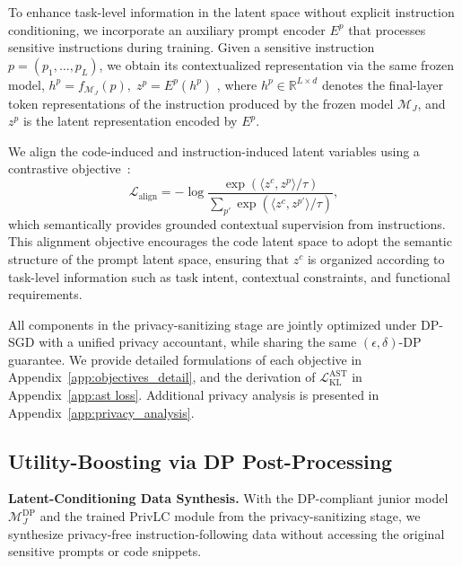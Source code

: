 \documentclass{article}
\theoremstyle{plain}
\theoremstyle{definition}
\theoremstyle{remark}
\begin{document}
To enhance task-level information in the latent space without explicit instruction conditioning, we incorporate an auxiliary prompt encoder $E^p$ that processes sensitive instructions during training. 
Given a sensitive instruction $p = (p_1, \dots, p_L)$, we obtain its contextualized representation via the same frozen model,
$h^p = f_{\mathcal{M}_J}(p),
\;
z^p = E^p(h^p)$
, where $h^p \in \mathbb{R}^{L \times d}$ denotes the final-layer token representations of the instruction produced by the frozen model $\mathcal{M}_J$, and $z^p$ is the latent representation encoded by $E^p$.


We align the code-induced and instruction-induced latent variables using a contrastive objective~\cite{oord2018representation}:
\begin{equation}
\mathcal{L}_{\text{align}} = - \log 
\frac{\exp(\langle z^c, z^p \rangle / \tau)}
{\sum_{p'} \exp(\langle z^c, z^{p'} \rangle / \tau)},
\end{equation}
which semantically provides grounded contextual supervision from instructions. This alignment objective encourages the code latent space to adopt the semantic structure of the prompt latent space, ensuring that $z^c$ is organized according to task-level information such as task intent, contextual constraints, and functional requirements.





All components in the privacy-sanitizing stage
are jointly optimized under DP-SGD with a unified privacy accountant, while sharing the same $(\epsilon,\delta)$-DP guarantee.  %
We provide detailed formulations of each objective in Appendix~\ref{app:objectives_detail}, and the derivation of $\mathcal{L}_{\text{KL}}^{\text{AST}}$ in Appendix~\ref{app:ast loss}. Additional privacy analysis is presented in Appendix~\ref{app:privacy_analysis}.




\subsection{Utility-Boosting via DP Post-Processing}
\label{sec:stage2}

\noindent\textbf{Latent-Conditioning Data Synthesis.}
With the DP-compliant junior model $\mathcal{M}_J^{\text{DP}}$ and the trained PrivLC module from the privacy-sanitizing stage, we synthesize privacy-free instruction-following data without accessing the original sensitive prompts or code snippets. 
\end{document}

